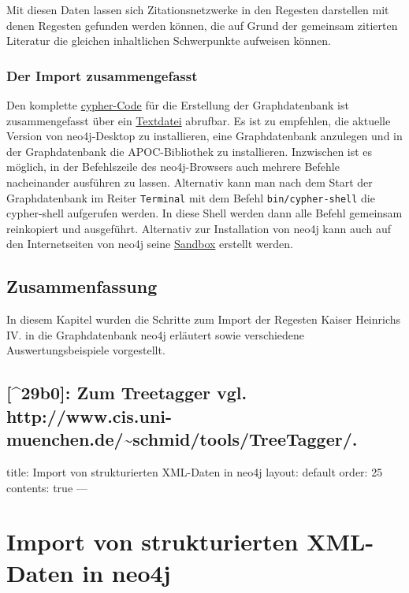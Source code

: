 \documentclass[12pt,ngerman,]{article}
\begin{document}
Mit diesen Daten lassen sich Zitationsnetzwerke in den Regesten
darstellen mit denen Regesten gefunden werden können, die auf Grund der
gemeinsam zitierten Literatur die gleichen inhaltlichen Schwerpunkte
aufweisen können.

\subsubsection{Der Import
zusammengefasst}\label{der-import-zusammengefasst}

Den komplette
\href{cypher/20_cypher-Datenbankerstellung.txt}{cypher-Code} für die
Erstellung der Graphdatenbank ist zusammengefasst über ein
\href{cypher/20_cypher-Datenbankerstellung.txt}{Textdatei} abrufbar. Es
ist zu empfehlen, die aktuelle Version von neo4j-Desktop zu
installieren, eine Graphdatenbank anzulegen und in der Graphdatenbank
die APOC-Bibliothek zu installieren. Inzwischen ist es möglich, in der
Befehlszeile des neo4j-Browsers auch mehrere Befehle nacheinander
ausführen zu lassen. Alternativ kann man nach dem Start der
Graphdatenbank im Reiter \texttt{Terminal} mit dem Befehl
\texttt{bin/cypher-shell} die cypher-shell aufgerufen werden. In diese
Shell werden dann alle Befehl gemeinsam reinkopiert und ausgeführt.
Alternativ zur Installation von neo4j kann auch auf den Internetseiten
von neo4j seine \href{https://neo4j.com/lp/try-neo4j-sandbox}{Sandbox}
erstellt werden.

\subsection{Zusammenfassung}\label{zusammenfassung-2}

In diesem Kapitel wurden die Schritte zum Import der Regesten Kaiser
Heinrichs IV. in die Graphdatenbank neo4j erläutert sowie verschiedene
Auswertungsbeispiele vorgestellt.

\subsection{{[}\^{}29b0{]}: Zum Treetagger vgl.
http://www.cis.uni-muenchen.de/\textasciitilde{}schmid/tools/TreeTagger/.}\label{b0-zum-treetagger-vgl.-httpwww.cis.uni-muenchen.deschmidtoolstreetagger.}

title: Import von strukturierten XML-Daten in neo4j layout: default
order: 25 contents: true ---

\section{Import von strukturierten XML-Daten in
neo4j}\label{import-von-strukturierten-xml-daten-in-neo4j}
\end{document}

